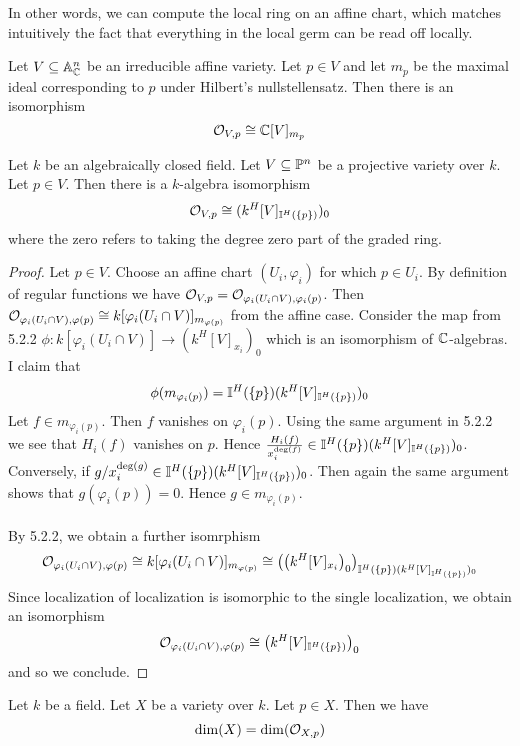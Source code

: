 \documentclass[a4paper]{article}
\begin{document}
In other words, we can compute the local ring on an affine chart, which matches intuitively the fact that everything in the local germ can be read off locally. 

\begin{prp}{}{} Let $V\subseteq\mathbb{A}_{\mathbb{C}}^n$ be an irreducible affine variety. Let $p\in V$ and let $m_p$ be the maximal ideal corresponding to $p$ under Hilbert's nullstellensatz. Then there is an isomorphism $$\mathcal{O}_{V,p}\cong\mathbb{C}[V]_{m_p}$$
\end{prp}

\begin{prp}{}{} Let $k$ be an algebraically closed field. Let $V\subseteq\mathbb{P}^n$ be a projective variety over $k$. Let $p\in V$. Then there is a $k$-algebra isomorphism $$\mathcal{O}_{V,p}\cong(k^H[V]_{\mathbb{I}^H(\{p\})})_0$$ where the zero refers to taking the degree zero part of the graded ring. \tcbline
\begin{proof}
Let $p\in V$. Choose an affine chart $(U_i,\varphi_i)$ for which $p\in U_i$. By definition of regular functions we have $\mathcal{O}_{V,p}=\mathcal{O}_{\varphi_i(U_i\cap V),\varphi_i(p)}$.  Then $\mathcal{O}_{\varphi_i(U_i\cap V),\varphi(p)}\cong k[\varphi_i(U_i\cap V)]_{m_{\varphi(p)}}$ from the affine case. Consider the map from 5.2.2 $\phi:k[\varphi_i(U_i\cap V)]\to (k^H[V]_{x_i})_0$ which is an isomorphism of $\mathbb{C}$-algebras. I claim that $$\phi(m_{\varphi_i(p)})=\mathbb{I}^H(\{p\})(k^H[V]_{\mathbb{I}^H(\{p\})})_0$$ Let $f\in m_{\varphi_i(p)}$. Then $f$ vanishes on $\varphi_i(p)$. Using the same argument in 5.2.2 we see that $H_i(f)$ vanishes on $p$. Hence $\frac{H_i(f)}{x_i^{\deg(f)}}\in\mathbb{I}^H(\{p\})(k^H[V]_{\mathbb{I}^H(\{p\})})_0$. Conversely, if $g/x_i^{\deg(g)}\in\mathbb{I}^H(\{p\})(k^H[V]_{\mathbb{I}^H(\{p\})})_0$. Then again the same argument shows that $g(\varphi_i(p))=0$. Hence $g\in m_{\varphi_i(p)}$. \\~\\

By 5.2.2, we obtain a further isomrphism $$\mathcal{O}_{\varphi_i(U_i\cap V),\varphi(p)}\cong k[\varphi_i(U_i\cap V)]_{m_{\varphi(p)}}\cong\left(\left(k^H[V]_{x_i}\right)_0\right)_{\mathbb{I}^H(\{p\})(k^H[V]_{\mathbb{I}^H(\{p\})})_0}$$ Since localization of localization is isomorphic to the single localization, we obtain an isomorphism $$\mathcal{O}_{\varphi_i(U_i\cap V),\varphi(p)}\cong\left(k^H[V]_{\mathbb{I}^H(\{p\})}\right)_0$$ and so we conclude. 
\end{proof}
\end{prp}

\begin{prp}{}{} Let $k$ be a field. Let $X$ be a variety over $k$. Let $p\in X$. Then we have $$\dim(X)=\dim(\mathcal{O}_{X,p})$$
\end{prp}
\end{document}
